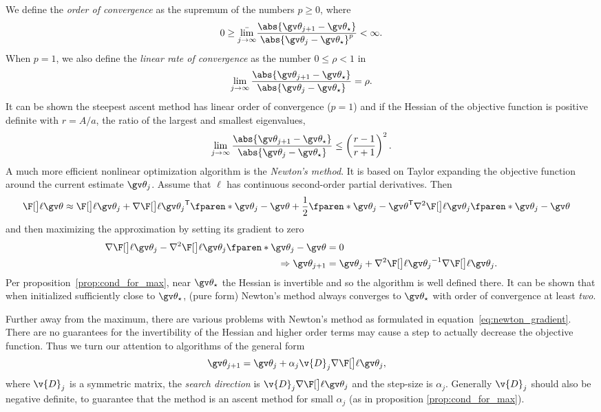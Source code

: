 We define the \emph{order of convergence} as the supremum of the
numbers $p\geq 0$, where
\begin{align}
	0\geq \bar{\lim_{j\to\infty}}\frac{\abs{\Th_{j+1}-\Th_\star}}{\abs{\Th_{j}-\Th_\star}^p} < \infty.
	\label{eq:order_of_convergence}
\end{align}
When $p=1$, we also define the \emph{linear rate of convergence} as
the number $0 \leq \rho < 1$ in
\begin{align}
	\lim_{j\to\infty}\frac{\abs{\Th_{j+1}-\Th_\star}}{\abs{\Th_{j}-\Th_\star}} = \rho.
	\label{eq:rate_of_convergence}
\end{align}
It can be shown the steepest ascent method has linear order of convergence ($p=1$)
and if the Hessian of the objective function is positive definite with
$r=A/a$, the ratio of the largest and smallest eigenvalues, 
\begin{align}
	\lim_{j\to\infty}\frac{\abs{\Th_{j+1}-\Th_\star}}{\abs{\Th_{j}-\Th_\star}} \leq \left(\frac{r-1}{r+1}\right)^2.
\end{align}
A much more efficient nonlinear optimization algorithm is the \emph{Newton's method}.
It is based on Taylor expanding the objective function around the
current estimate $\Th_j$. Assume that $\ell$ has continuous second-order partial derivatives. Then
\begin{align}
	\lLH[\Th] &\approx \lLH[\Th_j]+\nabla\lLH[\Th_j]^\tr\fparen*{\Th_j-\Th}+\frac{1}{2}\fparen*{\Th_j-\Th}^\tr\nabla^2\lLH[\Th_j]\fparen*{\Th_j-\Th}
	\label{eq:second_order_expansion}
\end{align}
and then maximizing the approximation by setting its gradient to zero
\begin{align}
	\nabla\lLH[\Th_j]-\nabla^2\lLH[\Th_j]\fparen*{\Th_j-\Th} &= 0\\
	\Rightarrow \Th_{j+1} &= \Th_j+\nabla^2\lLH[\Th_j]^{-1}\nabla\lLH[\Th_j].
	\label{eq:newton_gradient}
\end{align}
Per proposition~\ref{prop:cond_for_max}, near $\Th_\star$ the Hessian is 
invertible and so the algorithm is well defined there. It can be shown
that when initialized sufficiently close to $\Th_\star$, (pure form)
Newton's method always converges to $\Th_\star$ with order of convergence
at least \emph{two}.
 
Further away from the maximum, there are various problems with Newton's method as formulated
in equation~\eqref{eq:newton_gradient}. There are no guarantees for the invertibility
of the Hessian and higher order terms may cause a step to actually decrease the objective
function. Thus we turn our attention to algorithms of the general form
\begin{align}
	\Th_{j+1} &= \Th_j+\alpha_j\v{D}_j\nabla\lLH[\Th_j],
	\label{eq:gradient_method_general}
\end{align}
where $\v{D}_j$ is a symmetric matrix, the \emph{search direction} is $\v{D}_j\nabla\lLH[\Th_j]$ and
the step-size is $\alpha_j$. Generally $\v{D}_j$ should also be negative definite, to guarantee
that the method is an ascent method for small $\alpha_j$ (as in proposition \eqref{prop:cond_for_max}).
  
